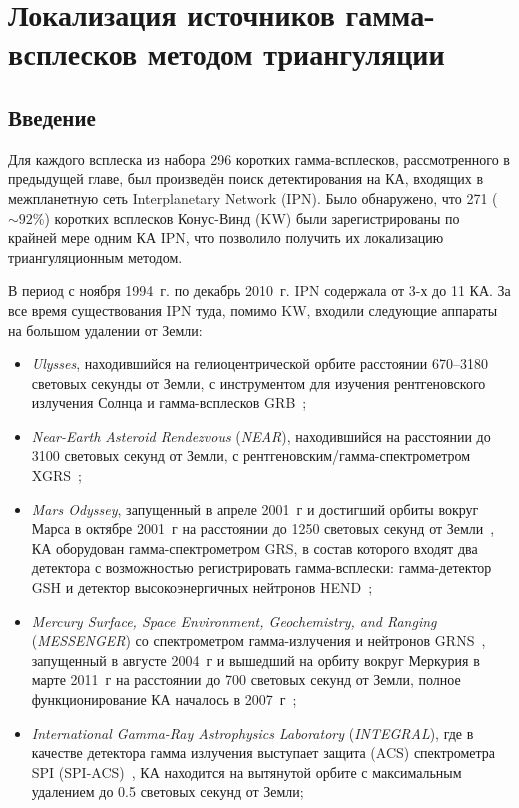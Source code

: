 \chapter{Локализация источников гамма-всплесков методом триангуляции} \label{IPN_catalog}
\section{Введение}
Для каждого всплеска из набора 296 коротких гамма-всплесков, рассмотренного в 
предыдущей главе, был произведён поиск детектирования на КА, входящих в межпланетную 
сеть Interplanetary Network (IPN). Было обнаружено, что 271 ($\sim 92$\%) коротких 
всплесков Конус-Винд (KW) были зарегистрированы по крайней мере одним КА IPN, 
что позволило получить их локализацию триангуляционным методом.

В период с ноября 1994~г. по декабрь 2010~г. IPN содержала от 3-х до 11 КА. 
За все время существования IPN туда, помимо KW, входили следующие аппараты
на большом удалении от Земли: 
\begin{itemize}
\item \textit{Ulysses}, находившийся на гелиоцентрической орбите расстоянии 
670--3180 световых секунды от Земли, с инструментом для изучения рентгеновского 
излучения Солнца и гамма-всплесков GRB~\citep{Hurley_1992AAS};
\item \textit{Near-Earth Asteroid Rendezvous} (\textit{NEAR}), находившийся 
на расстоянии до 3100 световых секунд от Земли, с рентгеновским/гамма-спектрометром XGRS~\citep{Trombka_1999NIMPA};
\item \textit{Mars Odyssey}, запущенный в апреле 2001~г и достигший орбиты вокруг 
Марса в октябре 2001~г на расстоянии до 1250 световых секунд от Земли~\citep{Saunders_2004SSRv}, 
КА оборудован гамма-спектрометром GRS, в состав которого входят два детектора 
с возможностью регистрировать гамма-всплески: гамма-детектор GSH и детектор 
высокоэнергичных нейтронов HEND~\citep{Boynton_2004SSRv, Hurley_2006ApJS_MO};
\item \textit{Mercury Surface, Space Environment, Geochemistry, and Ranging} (\textit{MESSENGER}) 
со спектрометром гамма-излучения и нейтронов GRNS~\citep{Goldsten_2007SSRv}, 
запущенный в августе 2004~г и вышедший на орбиту вокруг Меркурия в марте 2011~г 
на расстоянии до 700 световых секунд от Земли, полное функционирование КА 
началось в 2007~г~\citep{Gold_2001PSS,Solomon_2007SSRv};
\item \textit{International Gamma-Ray Astrophysics Laboratory} (\textit{INTEGRAL}), 
где в качестве детектора гамма излучения выступает защита (ACS) спектрометра 
SPI (SPI-ACS)~\citep{Rau_2005AA}, КА находится на вытянутой орбите с максимальным 
удалением до 0.5 световых секунд от Земли;
\end{itemize}


